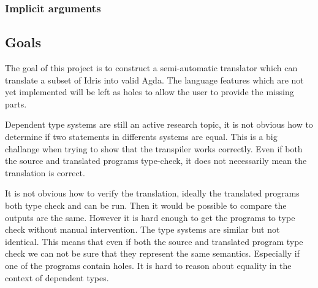 \documentclass[parskip=half]{scrartcl}
\begin{document}
\subsubsection{Implicit arguments}


\subsection{Goals}
The goal of this project is to construct a semi-automatic translator which can
translate a subset of Idris into valid Agda. The language features which are
not yet implemented will be left as holes to allow the user to provide the
missing parts.



Dependent type systems are still an active research topic, it is not obvious
how to determine if two statements in differents systems are equal. This is
a big challange when trying to show that the transpiler works correctly.  Even
if both the source and translated programs type-check, it does not necessarily
mean the translation is correct.

It is not obvious how to verify the translation, ideally the translated
programs both type check and can be run. Then it would be possible to compare
the outputs are the same. However it is hard enough to get the programs to type
check without manual intervention. The type systems are similar but not
identical. This means that even if both the source and translated program
type check we can not be sure that they represent the same semantics.
Especially if one of the programs contain holes. It is hard to reason about
equality in the context of dependent types.
\end{document}
